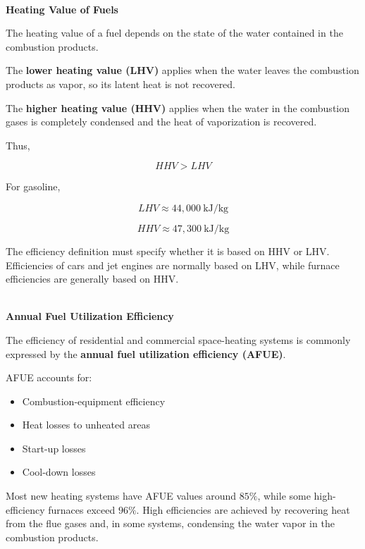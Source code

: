 \documentclass[12pt]{article}
\begin{document}
\textbf{\\ Heating Value of Fuels}

The heating value of a fuel depends on the state of the water contained in the combustion products.

The \textbf{lower heating value (LHV)} applies when the water leaves the combustion products as vapor, so its latent heat is not recovered.

The \textbf{higher heating value (HHV)} applies when the water in the combustion gases is completely condensed and the heat of vaporization is recovered.

Thus,

\begin{equation*}
HHV > LHV
\end{equation*}

For gasoline,

\begin{equation*}
LHV \approx 44{,}000\ \text{kJ/kg}
\end{equation*}

\begin{equation*}
HHV \approx 47{,}300\ \text{kJ/kg}
\end{equation*}

The efficiency definition must specify whether it is based on HHV or LHV. Efficiencies of cars and jet engines are normally based on LHV, while furnace efficiencies are generally based on HHV. 

\textbf{\\ Annual Fuel Utilization Efficiency}

The efficiency of residential and commercial space-heating systems is commonly expressed by the \textbf{annual fuel utilization efficiency (AFUE)}.

AFUE accounts for:

\begin{itemize}
    \item Combustion-equipment efficiency
    \item Heat losses to unheated areas
    \item Start-up losses
    \item Cool-down losses
\end{itemize}

Most new heating systems have AFUE values around $85\%$, while some high-efficiency furnaces exceed $96\%$. High efficiencies are achieved by recovering heat from the flue gases and, in some systems, condensing the water vapor in the combustion products. 
\end{document}
